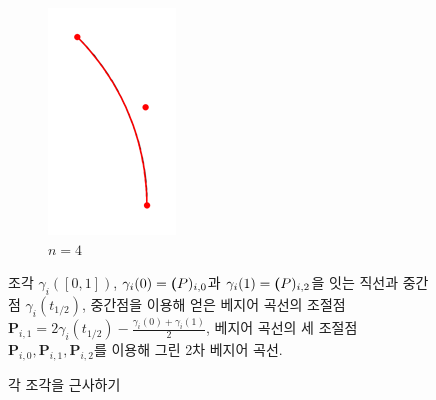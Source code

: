 \documentclass{gshs_thesis}
\theoremstyle{theorem}
\theoremstyle{lemma}
\theoremstyle{definition}
\begin{document}
\begin{figure}[h]
\begin{center}
\begin{subfigure}{.2\textwidth}
		    \includegraphics[width=\textwidth]{image/BCstep4}
		    \caption{$n=4$}
	    \end{subfigure}
	\end{center} 
    \caption{각 조각을 근사하기}
	\raggedright \small  조각 $\gamma_{i}([0,1])$, $\gamma_{i}(0)=\textbf(P)_{i,0}$과 $\gamma_{i}(1)=\textbf(P)_{i,2}$을 잇는 직선과 중간점 $\gamma_{i}(t_{1/2})$, 중간점을 이용해 얻은 베지어 곡선의 조절점 $\textbf{P}_{i,1}=2\gamma_{i}(t_{1/2})-\frac{\gamma_{i}(0)+\gamma_{i}(1)}{2}$, 베지어 곡선의 세 조절점 $\textbf{P}_{i,0},\textbf{P}_{i,1},\textbf{P}_{i,2}$를 이용해 그린 2차 베지어 곡선.
\end{figure}
\end{document}
